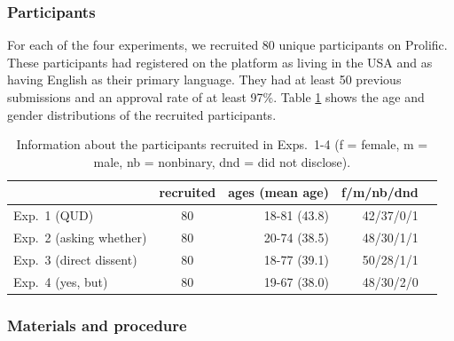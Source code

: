 \documentclass[times,linguex,xcolor]{glossa}
\begin{document}
    \subsubsection{Participants}

      For each of the four experiments, we recruited 80 unique participants on Prolific. These participants had registered on the platform as living in the USA and as having English as their primary language. They had at least 50 previous submissions and an approval rate of at least 97\%.  Table \ref{t:recruited} shows the age and gender distributions of the recruited participants.

      \begin{table}[h!]
      \centering
      \begin{tabular}{l | c | r r r }
                  & recruited & ages (mean age) & f/m/nb/dnd \\ \hline
      Exp.~1 (QUD) & 80 & 18-81 (43.8) & 42/37/0/1  \\
      Exp.~2 (asking whether) & 80 & 20-74 (38.5)  & 48/30/1/1  \\
      Exp.~3 (direct dissent) & 80 & 18-77 (39.1) & 50/28/1/1  \\
      Exp.~4 (yes, but) &80 & 19-67 (38.0)  & 48/30/2/0 &  \\
      \hline
      \end{tabular}

      \caption{Information about the participants recruited in Exps.~1-4 (f = female, m = male, nb = nonbinary, dnd = did not disclose).}\label{t:recruited}
      \end{table}

    \subsubsection{Materials and procedure}
      
\end{document}
